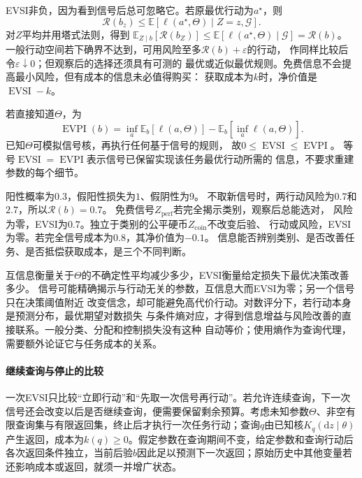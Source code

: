 EVSI非负，因为看到信号后总可忽略它。若原最优行动为$a^\star$，则
\[
  \mathcal R(b_z)\leq
  \mathbb E[\ell(a^\star,\Theta)\mid Z=z,\mathcal G].
\]
对$Z$平均并用塔式法则，得到
$\mathbb E_{Z\mid b}[\mathcal R(b_Z)]\leq
\mathbb E[\ell(a^\star,\Theta)\mid\mathcal G]=\mathcal R(b)$。
一般行动空间若下确界不达到，可用风险至多$\mathcal R(b)+\varepsilon$的行动，
作同样比较后令$\varepsilon\downarrow0$；但观察后的选择还须具有可测的
最优或近似最优规则。免费信息不会提高最小风险，但有成本的信息未必值得购买：
获取成本为$k$时，净价值是$\operatorname{EVSI}-k$。

若直接知道$\Theta$，为
\begin{equation}
  \operatorname{EVPI}(b)
  =\inf_a\mathbb E_b[\ell(a,\Theta)]
    -\mathbb E_b[\inf_a\ell(a,\Theta)].
  \label{eq:decision-evpi}
\end{equation}
已知$\Theta$可模拟信号核，再执行任何基于信号的规则，
故$0\leq\operatorname{EVSI}\leq\operatorname{EVPI}$。
等号$\operatorname{EVSI}=\operatorname{EVPI}$表示信号已保留实现该任务最优行动所需的
信息，不要求重建参数的每个细节。

\begin{example}[辨别信号与无关信号]
\label{ex:decision-informative-and-irrelevant-signals}
阳性概率为$0.3$，假阳性损失为$1$、假阴性为$9$。
不取新信号时，两行动风险为$0.7$和$2.7$，所以$\mathcal R(b)=0.7$。
免费信号$Z_{\mathrm{perf}}$若完全揭示类别，观察后总能选对，
风险为零，EVSI为$0.7$。独立于类别的公平硬币$Z_{\mathrm{coin}}$不改变后验、
行动或风险，EVSI为零。若完全信号成本为$0.8$，其净价值为$-0.1$。
信息能否辨别类别、是否改善任务、是否抵偿获取成本，是三个不同判断。
\end{example}

互信息衡量关于$\Theta$的不确定性平均减少多少，EVSI衡量给定损失下最优决策改善多少。
信号可能精确揭示与行动无关的参数，互信息大而EVSI为零；另一个信号只在决策阈值附近
改变信念，却可能避免高代价行动。对数评分下，若行动本身是预测分布，最优期望对数损失
与条件熵对应，才得到信息增益与风险改善的直接联系。一般分类、分配和控制损失没有这种
自动等价；使用熵作为查询代理，需要额外论证它与任务成本的关系。

\paragraph{继续查询与停止的比较}
一次EVSI只比较“立即行动”和“先取一次信号再行动”。若允许连续查询，下一次信号还会改变以后是否继续查询，便需要保留剩余预算。考虑未知参数\(\Theta\)、非空有限查询集与有限返回集，终止后才执行一次任务行动；查询\(q\)由已知核\(K_q(\mathrm dz\mid\theta)\)产生返回，成本为\(k(q)\geq0\)。假定参数在查询期间不变，给定参数和查询行动后各次返回条件独立，当前后验\(b\)因此足以预测下一次返回；原始历史中其他变量若还影响成本或返回，就须一并增广状态。

